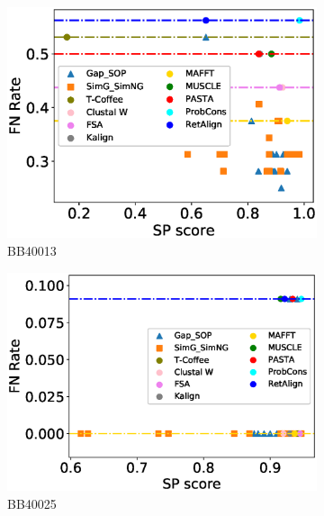 \begin{figure}[!htbp]
\begin{adjustwidth}{-1.5cm}{-1cm}
\begin{subfigure}{0.22\textwidth}
			\includegraphics[width=\columnwidth]{Figure/summary/precomputedInit/Balibase/BB40013_fnrate_vs_sp_2}
			\caption{BB40013}
		\end{subfigure}
		\begin{subfigure}{0.22\textwidth}
			\includegraphics[width=\columnwidth]{Figure/summary/precomputedInit/Balibase/BB40025_fnrate_vs_sp_2}
			\caption{BB40025}
		\end{subfigure}
		\begin{subfigure}{0.22\textwidth}

\end{subfigure}
\end{adjustwidth}
\end{figure}
